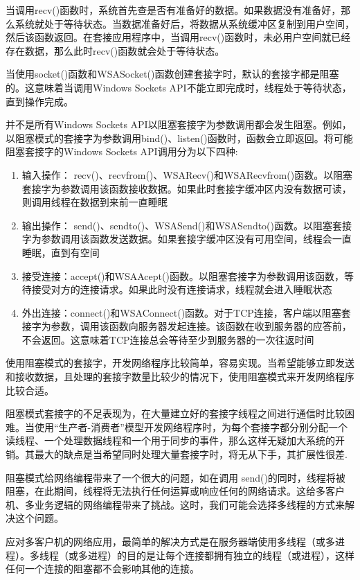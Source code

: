 \documentclass[UTF8,a4paper,12pt]{ctexbook}
\begin{document}
			当调用recv()函数时，系统首先查是否有准备好的数据。如果数据没有准备好，那么系统就处于等待状态。当数据准备好后，将数据从系统缓冲区复制到用户空间，然后该函数返回。在套接应用程序中，当调用recv()函数时，未必用户空间就已经存在数据，那么此时recv()函数就会处于等待状态。
			
			当使用socket()函数和WSASocket()函数创建套接字时，默认的套接字都是阻塞的。这意味着当调用Windows Sockets API不能立即完成时，线程处于等待状态，直到操作完成。
			
			并不是所有Windows Sockets API以阻塞套接字为参数调用都会发生阻塞。例如，以阻塞模式的套接字为参数调用bind()、listen()函数时，函数会立即返回。将可能阻塞套接字的Windows Sockets API调用分为以下四种:
			\begin{enumerate}[itemindent = 1em]
				\item 输入操作： recv()、recvfrom()、WSARecv()和WSARecvfrom()函数。以阻塞套接字为参数调用该函数接收数据。如果此时套接字缓冲区内没有数据可读，则调用线程在数据到来前一直睡眠
				\item 输出操作： send()、sendto()、WSASend()和WSASendto()函数。以阻塞套接字为参数调用该函数发送数据。如果套接字缓冲区没有可用空间，线程会一直睡眠，直到有空间
				\item 接受连接：accept()和WSAAcept()函数。以阻塞套接字为参数调用该函数，等待接受对方的连接请求。如果此时没有连接请求，线程就会进入睡眠状态
				\item 外出连接：connect()和WSAConnect()函数。对于TCP连接，客户端以阻塞套接字为参数，调用该函数向服务器发起连接。该函数在收到服务器的应答前，不会返回。这意味着TCP连接总会等待至少到服务器的一次往返时间
			\end{enumerate}
			
			使用阻塞模式的套接字，开发网络程序比较简单，容易实现。当希望能够立即发送和接收数据，且处理的套接字数量比较少的情况下，使用阻塞模式来开发网络程序比较合适。
			
			阻塞模式套接字的不足表现为，在大量建立好的套接字线程之间进行通信时比较困难。当使用“生产者-消费者”模型开发网络程序时，为每个套接字都分别分配一个读线程、一个处理数据线程和一个用于同步的事件，那么这样无疑加大系统的开销。其最大的缺点是当希望同时处理大量套接字时，将无从下手，其扩展性很差.
			
			阻塞模式给网络编程带来了一个很大的问题，如在调用 send()的同时，线程将被阻塞，在此期间，线程将无法执行任何运算或响应任何的网络请求。这给多客户机、多业务逻辑的网络编程带来了挑战。这时，我们可能会选择多线程的方式来解决这个问题。
			
			应对多客户机的网络应用，最简单的解决方式是在服务器端使用多线程（或多进程）。多线程（或多进程）的目的是让每个连接都拥有独立的线程（或进程），这样任何一个连接的阻塞都不会影响其他的连接。
			
\end{document}
